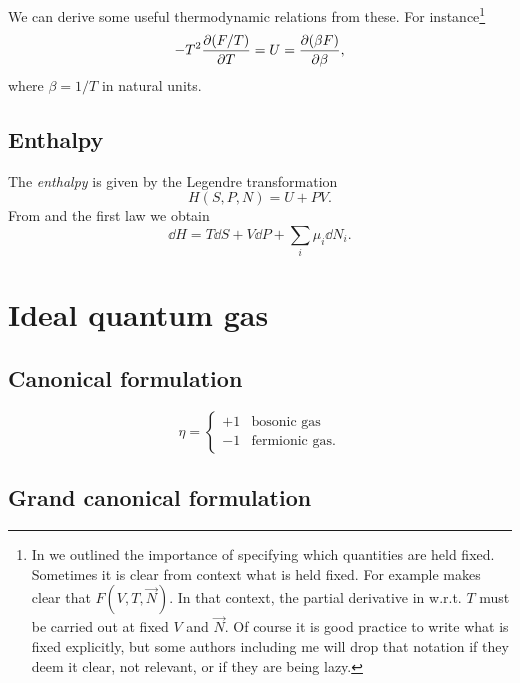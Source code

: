 We can derive some useful thermodynamic relations from these. For
instance\footnote{In  we outlined the importance of
specifying which quantities are held fixed. Sometimes it is clear from context
what is held fixed. For example  makes clear
that $F(V,T,\vec{N})$. In that context, the partial derivative in
 w.r.t. $T$ must be carried out at fixed $V$ and $\vec{N}$.
Of course it is good practice to write what is fixed explicitly, but some
authors including me will drop that notation if they deem it clear, not
relevant, or if they are being lazy.}
\begin{equation}\label{eq:dfdt}
  -T^2\pdv{(F/T)}{T}=U=\pdv{(\beta F)}{\beta},
\end{equation}
where $\beta=1/T$ in natural units.


\subsection{Enthalpy}

The {\it enthalpy} is given by the Legendre transformation
\begin{equation}\label{eq:enthalpy}
 H(S,P,N)=U+PV.
\end{equation}
From  and the first law we obtain
\begin{equation}
 \dd H = T\dd{S} +V\dd{P} +\sum_i\mu_i\dd N_i.
\end{equation}


\section{Ideal quantum gas}

\subsection{Canonical formulation}

\begin{equation}
\eta=
  \begin{cases}
     +1 & \text{bosonic gas} \\
     -1 & \text{fermionic gas}.
  \end{cases}
\end{equation}

\subsection{Grand canonical formulation}

